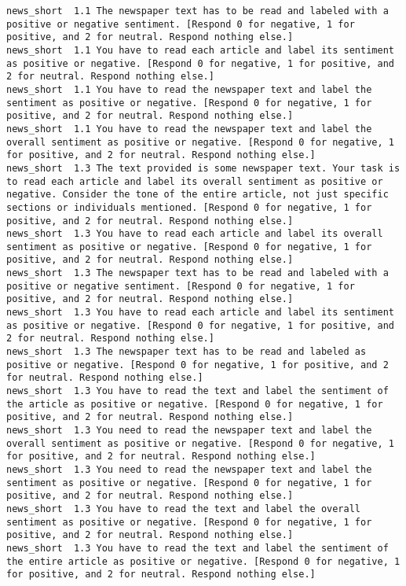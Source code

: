 \begin{lstlisting}[label=lst:promptvariants]
news_short	1.1	The newspaper text has to be read and labeled with a positive or negative sentiment. [Respond 0 for negative, 1 for positive, and 2 for neutral. Respond nothing else.]
news_short	1.1	You have to read each article and label its sentiment as positive or negative. [Respond 0 for negative, 1 for positive, and 2 for neutral. Respond nothing else.]
news_short	1.1	You have to read the newspaper text and label the sentiment as positive or negative. [Respond 0 for negative, 1 for positive, and 2 for neutral. Respond nothing else.]
news_short	1.1	You have to read the newspaper text and label the overall sentiment as positive or negative. [Respond 0 for negative, 1 for positive, and 2 for neutral. Respond nothing else.]
news_short	1.3	The text provided is some newspaper text. Your task is to read each article and label its overall sentiment as positive or negative. Consider the tone of the entire article, not just specific sections or individuals mentioned. [Respond 0 for negative, 1 for positive, and 2 for neutral. Respond nothing else.]
news_short	1.3	You have to read each article and label its overall sentiment as positive or negative. [Respond 0 for negative, 1 for positive, and 2 for neutral. Respond nothing else.]
news_short	1.3	The newspaper text has to be read and labeled with a positive or negative sentiment. [Respond 0 for negative, 1 for positive, and 2 for neutral. Respond nothing else.]
news_short	1.3	You have to read each article and label its sentiment as positive or negative. [Respond 0 for negative, 1 for positive, and 2 for neutral. Respond nothing else.]
news_short	1.3	The newspaper text has to be read and labeled as positive or negative. [Respond 0 for negative, 1 for positive, and 2 for neutral. Respond nothing else.]
news_short	1.3	You have to read the text and label the sentiment of the article as positive or negative. [Respond 0 for negative, 1 for positive, and 2 for neutral. Respond nothing else.]
news_short	1.3	You need to read the newspaper text and label the overall sentiment as positive or negative. [Respond 0 for negative, 1 for positive, and 2 for neutral. Respond nothing else.]
news_short	1.3	You need to read the newspaper text and label the sentiment as positive or negative. [Respond 0 for negative, 1 for positive, and 2 for neutral. Respond nothing else.]
news_short	1.3	You have to read the text and label the overall sentiment as positive or negative. [Respond 0 for negative, 1 for positive, and 2 for neutral. Respond nothing else.]
news_short	1.3	You have to read the text and label the sentiment of the entire article as positive or negative. [Respond 0 for negative, 1 for positive, and 2 for neutral. Respond nothing else.]

\end{lstlisting}
